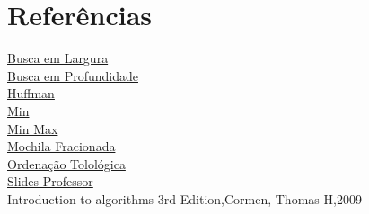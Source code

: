 \documentclass[12pt,a4paper,twoside]{report}
\begin{document}
\chapter{Referências}
\href{https://en.wikipedia.org/wiki/Busca_em_largura}{Busca em Largura}\\
\href{https://en.wikipedia.org/wiki/Busca_em_profundidade}{Busca em Profundidade}\\
\href{https://pt.wikipedia.org/wiki/Codificação_de_Huffman}{Huffman}\\
\href{http://www.cplusplus.com/reference/algorithm/min_element}{Min}\\
\href{http://en.cppreference.com/w/cpp/algorithm/minmax_element}{Min Max}\\
\href{https://pt.wikipedia.org/wiki/Problema_da_mochila}{Mochila Fracionada}\\
\href{https://pt.wikipedia.org/wiki/Ordenação_topológica}{Ordenação Tolológica}\\
\href{https://groups.google.com/forum/#!topic/gbc052/}{Slides Professor}\\
Introduction to algorithms 3rd Edition,Cormen, Thomas H,2009
  
\end{document}
